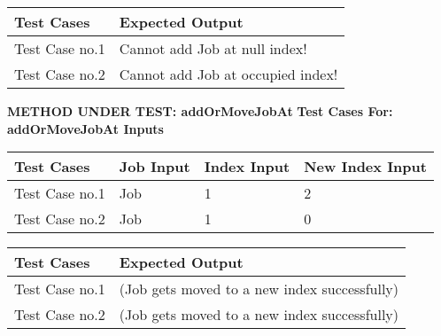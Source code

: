 \documentclass[12pt]{report}
\begin{document}
	\begin{flushleft}
		\begin{tabular}{ | l | l | }
			\hline
			Test Cases & Expected Output \\ \hline
			Test Case no.1 & Cannot add Job at null index! \\ \hline
			Test Case no.2 & Cannot add Job at occupied index! \\ \hline
		\end{tabular}
	\end{flushleft}

	\textbf{METHOD UNDER TEST: addOrMoveJobAt} \newline
	\textbf{Test Cases For: addOrMoveJobAt Inputs}
	\begin{flushleft}
		\begin{tabular}{ | l | l | l | l | }
			\hline
			Test Cases & Job Input & Index Input & New Index Input \\ \hline
			Test Case no.1 & Job & 1 & 2 \\ \hline
			Test Case no.2 & Job & 1 & 0 \\ \hline
		\end{tabular}
	\end{flushleft}
	
	\begin{flushleft}
		\begin{tabular}{ | l | l | }
			\hline
			Test Cases & Expected Output \\ \hline
			Test Case no.1 & (Job gets moved to a new index successfully) \\ \hline
			Test Case no.2 & (Job gets moved to a new index successfully) \\ \hline
		\end{tabular}
	\end{flushleft}
\newpage
\end{document}
